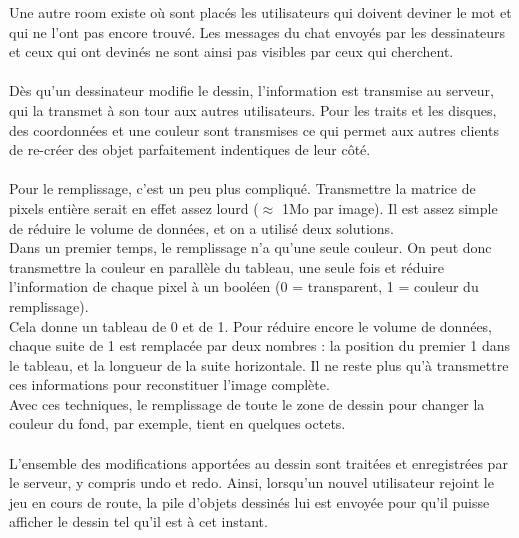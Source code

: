 \documentclass[11pt,a4paper]{article}
\begin{document}
                Une autre room existe où sont placés les utilisateurs qui doivent deviner le mot et qui ne l'ont pas encore trouvé.
                Les messages du chat envoyés par les dessinateurs et ceux qui ont devinés ne sont ainsi pas visibles par ceux qui cherchent.
                \paragraph{}
                Dès qu'un dessinateur modifie le dessin, l'information est transmise au serveur,
                qui la transmet à son tour aux autres utilisateurs.
                Pour les traits et les disques,
                des coordonnées et une couleur sont transmises ce qui permet aux autres
                clients de re-créer des objet parfaitement indentiques de leur côté.
                \paragraph{}
                Pour le remplissage, c'est un peu plus compliqué.
                Transmettre la matrice de pixels entière serait en effet assez lourd ($\approx$ 1Mo par image).
                Il est assez simple de réduire le volume de données, et on a utilisé deux solutions.\\                
                Dans un premier temps, le remplissage n'a qu'une seule couleur.
                On peut donc transmettre la couleur en parallèle du tableau, une seule fois et réduire l'information de chaque pixel à un booléen
                (0 = transparent, 1 = couleur du remplissage). \\
                Cela donne un tableau de 0 et de 1.
                Pour réduire encore le volume de données,
                chaque suite de 1 est remplacée par deux nombres :
                la position du premier 1 dans le tableau, et la longueur de la suite horizontale.
                Il ne reste plus qu'à transmettre ces informations pour reconstituer l'image complète.\\
                Avec ces techniques, le remplissage de toute le zone de dessin pour changer la couleur du fond,
                par exemple, tient en quelques octets.
                \paragraph{}
                L'ensemble des modifications apportées au dessin sont traitées et enregistrées par le serveur,
                y compris undo et redo.
                Ainsi, lorsqu'un nouvel utilisateur rejoint le jeu en cours de route,
                la pile d'objets dessinés lui est envoyée pour qu'il puisse afficher le dessin tel qu'il est à cet instant.
\end{document}
